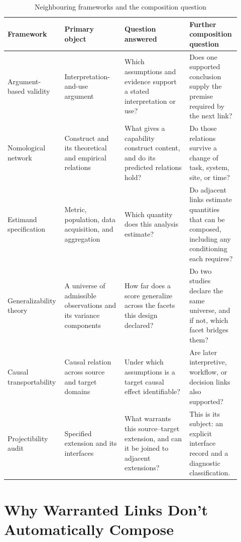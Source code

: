 \documentclass[12pt]{article}
\begin{document}
\begin{table}[!t]
\centering\small
\caption{Neighbouring frameworks and the composition question}\label{tab:frameworks}
\begin{tabular}{@{}>{\raggedright\arraybackslash}p{0.20\linewidth}
                    >{\raggedright\arraybackslash}p{0.25\linewidth}
                    >{\raggedright\arraybackslash}p{0.27\linewidth}
                    >{\raggedright\arraybackslash}p{0.20\linewidth}@{}}
\toprule
Framework & Primary object & Question answered & Further composition question \\
\midrule
Argument-based validity & Interpretation-and-use argument & Which assumptions and evidence support a stated interpretation or use? & Does one supported conclusion supply the premise required by the next link? \\
Nomological network & Construct and its theoretical and empirical relations & What gives a capability construct content, and do its predicted relations hold? & Do those relations survive a change of task, system, site, or time? \\
Estimand specification & Metric, population, data acquisition, and aggregation & Which quantity does this analysis estimate? & Do adjacent links estimate quantities that can be composed, including any conditioning each requires? \\
Generalizability theory & A universe of admissible observations and its variance components & How far does a score generalize across the facets this design declared? & Do two studies declare the same universe, and if not, which facet bridges them? \\
Causal transportability & Causal relation across source and target domains & Under which assumptions is a target causal effect identifiable? & Are later interpretive, workflow, or decision links also supported? \\
Projectibility audit & Specified extension and its interfaces & What warrants this source--target extension, and can it be joined to adjacent extensions? & This is its subject: an explicit interface record and a diagnostic classification. \\
\bottomrule
\end{tabular}
\end{table}

\section{Why Warranted Links Don't Automatically Compose}\label{sec:composition}
\end{document}
